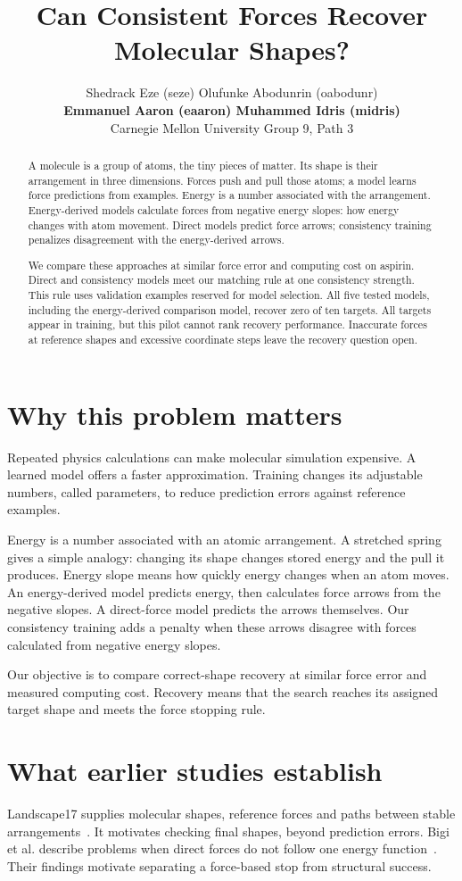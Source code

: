 \documentclass{article}
\title{Can Consistent Forces Recover Molecular Shapes?}
\author{Shedrack Eze (seze) \quad Olufunke Abodunrin (oabodunr)\\
\textbf{Emmanuel Aaron (eaaron) \quad Muhammed Idris (midris)}\\
Carnegie Mellon University \quad Group 9, Path 3}
\begin{document}
\maketitle
\begin{abstract}
A molecule is a group of atoms, the tiny pieces of matter. Its shape is their arrangement in three dimensions. Forces push and pull those atoms; a model learns force predictions from examples. Energy is a number associated with the arrangement. Energy-derived models calculate forces from negative energy slopes: how energy changes with atom movement. Direct models predict force arrows; consistency training penalizes disagreement with the energy-derived arrows.

We compare these approaches at similar force error and computing cost on aspirin. Direct and consistency models meet our matching rule at one consistency strength. This rule uses validation examples reserved for model selection. All five tested models, including the energy-derived comparison model, recover zero of ten targets. All targets appear in training, but this pilot cannot rank recovery performance. Inaccurate forces at reference shapes and excessive coordinate steps leave the recovery question open.
\end{abstract}
\section{Why this problem matters}
Repeated physics calculations can make molecular simulation expensive. A learned model offers a faster approximation. Training changes its adjustable numbers, called parameters, to reduce prediction errors against reference examples.

Energy is a number associated with an atomic arrangement. A stretched spring gives a simple analogy: changing its shape changes stored energy and the pull it produces. Energy slope means how quickly energy changes when an atom moves. An energy-derived model predicts energy, then calculates force arrows from the negative slopes. A direct-force model predicts the arrows themselves. Our consistency training adds a penalty when these arrows disagree with forces calculated from negative energy slopes.

Our objective is to compare correct-shape recovery at similar force error and measured computing cost. Recovery means that the search reaches its assigned target shape and meets the force stopping rule.
\section{What earlier studies establish}
Landscape17 supplies molecular shapes, reference forces and paths between stable arrangements~\cite{landscape}. It motivates checking final shapes, beyond prediction errors. Bigi et al. describe problems when direct forces do not follow one energy function~\cite{bigi}. Their findings motivate separating a force-based stop from structural success.
\end{document}
